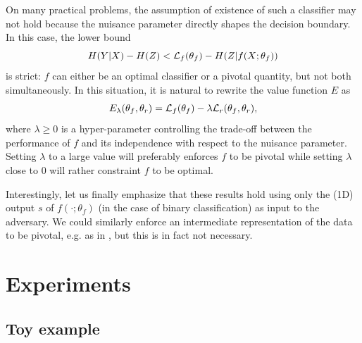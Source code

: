 \documentclass[twocolumn,superscriptaddress,aps]{revtex4-1}
\theoremstyle{plain}
\begin{document}
On many practical problems, the assumption of existence of such a classifier may
not hold because the nuisance parameter directly shapes the decision boundary.
In this case, the lower bound $$ H({Y|X}) - H(Z) < {\cal L}_f(\theta_f) - H({Z|f(X;\theta_f)})$$ is strict: $f$ can either be an optimal classifier or a
pivotal quantity, but not both simultaneously. In this situation, it is natural
to rewrite the value function $E$  as
\begin{equation}\label{eqn:vf-lambda}
    E_\lambda(\theta_f, \theta_r) = {\cal L}_f(\theta_f) - \lambda {\cal L}_r(\theta_f, \theta_r),
\end{equation}
where $\lambda \geq 0$ is a hyper-parameter controlling the trade-off between
the performance of $f$ and its independence with respect to the nuisance
parameter. Setting $\lambda$ to a large value will preferably enforces $f$ to
be pivotal while setting $\lambda$ close to $0$ will rather constraint $f$ to be
optimal.

Interestingly, let us finally emphasize that these results hold using only the (1D) output $s$
of $f(\cdot;\theta_f)$ (in the case of binary classification) as input to the adversary. We
could similarly enforce an intermediate representation of the data to be
pivotal, e.g. as in \citep{ganin2014unsupervised}, but this is in fact not
necessary.



\section{Experiments}

\subsection{Toy example}
\label{sec:toy}
\end{document}
